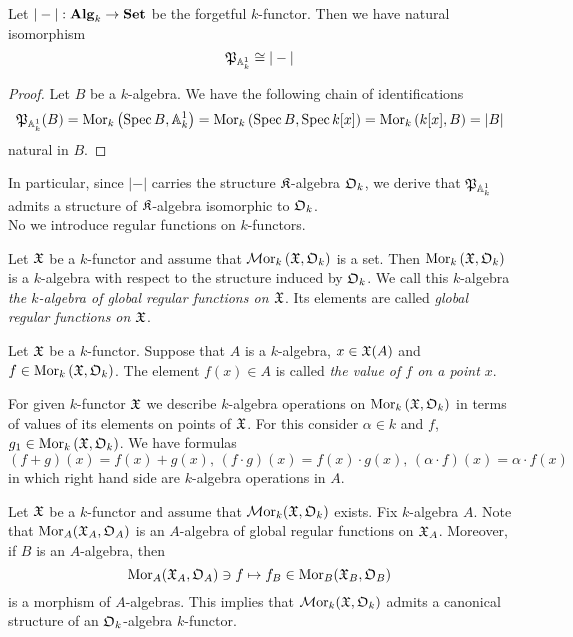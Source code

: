 \begin{fact}\label{fact:affineline_as_forgetfulfunctor}
Let $|-|:\mathbf{Alg}_k\rightarrow \mathbf{Set}$ be the forgetful $k$-functor. Then we have natural isomorphism
$${\mathfrak P}_{\mathbb{A}^1_k} \cong |-|$$
\end{fact}
\begin{proof}
Let $B$ be a $k$-algebra. We have the following chain of identifications
$${\mathfrak P}_{\mathbb{A}^1_k}(B) = \mathrm{Mor}_k\left(\mathrm{Spec}\, B, \mathbb{A}^1_k\right) = \mathrm{Mor}_k\left(\mathrm{Spec}\, B, \mathrm{Spec}\, k[x]\right) = \mathrm{Mor}_k\left(k[x], B\right) = |B|$$
natural in $B$.
\end{proof}
\noindent
In particular, since $|-|$ carries the structure ${\mathfrak K}$-algebra ${\mathfrak O}_k$, we derive that ${\mathfrak P}_{\mathbb{A}^1_k}$ admits a structure of ${\mathfrak K}$-algebra isomorphic to ${\mathfrak O}_k$.\\
No we introduce regular functions on $k$-functors.

\begin{definition}
Let ${\mathfrak X}$ be a $k$-functor and assume that $\mathcal{M}\mathrm{or}_k\left({\mathfrak X}, {\mathfrak O}_k\right)$ is a set. Then $\mathrm{Mor}_k\left({\mathfrak X}, {\mathfrak O}_k\right)$ is a $k$-algebra with respect to the structure induced by ${\mathfrak O}_k$. We call this $k$-algebra \textit{the $k$-algebra of global regular functions on ${\mathfrak X}$}. Its elements are called \textit{global regular functions on ${\mathfrak X}$}.
\end{definition}

\begin{definition}
Let ${\mathfrak X}$ be a $k$-functor. Suppose that $A$ is a $k$-algebra, $x\in {\mathfrak X}(A)$ and $f\in \mathrm{Mor}_k\left({\mathfrak X},{\mathfrak O}_k\right)$. The element $f(x) \in A$ is called \textit{the value of $f$ on a point $x$}.
\end{definition}
\noindent
For given $k$-functor ${\mathfrak X}$ we describe $k$-algebra operations on $\mathrm{Mor}_k\left({\mathfrak X},{\mathfrak O}_k\right)$ in terms of values of its elements on points of ${\mathfrak X}$. For this consider $\alpha \in k$ and $f$, $g_1\in \mathrm{Mor}_k\left({\mathfrak X}, {\mathfrak O}_k\right)$. We have formulas
$$\left(f+g\right)(x) = f(x)+g(x),\,\left(f\cdot g\right)(x) = f(x)\cdot g(x),\,\left(\alpha \cdot f\right)(x) = \alpha \cdot f(x)$$
in which right hand side are $k$-algebra operations in $A$.

\begin{example}\label{example:regular_functions_as_an_algebra_over_structure_algebra}
Let ${\mathfrak X}$ be a $k$-functor and assume that $\mathcal{M}\mathrm{or}_k({\mathfrak X},{\mathfrak O}_k)$ exists. Fix $k$-algebra $A$. Note that $\mathrm{Mor}_A({\mathfrak X}_A,{\mathfrak O}_A)$ is an $A$-algebra of global regular functions on ${\mathfrak X}_A$. Moreover, if $B$ is an $A$-algebra, then
$$\mathrm{Mor}_A({\mathfrak X}_A,{\mathfrak O}_A) \ni f \mapsto f_B\in \mathrm{Mor}_B({\mathfrak X}_B,{\mathfrak O}_B)$$
is a morphism of $A$-algebras. This implies that $\mathcal{M}\mathrm{or}_k({\mathfrak X},{\mathfrak O}_k)$ admits a canonical structure of an ${\mathfrak O}_k$-algebra $k$-functor.
\end{example}

